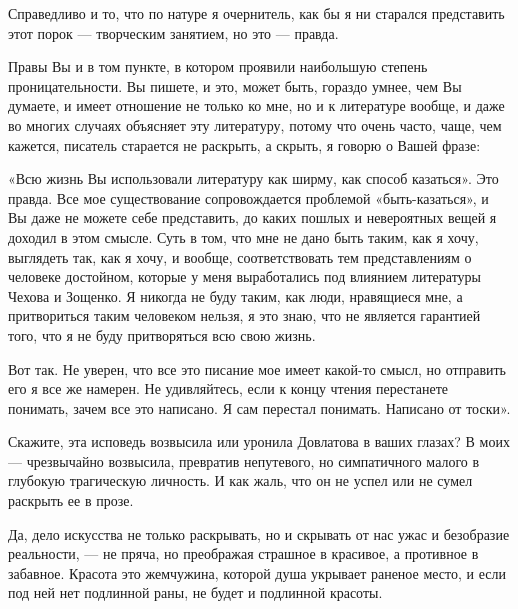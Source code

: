 Справедливо и то, что по натуре я очернитель, как бы я ни старался представить
этот порок — творческим занятием, но это — правда. 

Правы Вы и в том пункте, в котором проявили наибольшую степень
проницательности. Вы пишете, и это, может быть, гораздо умнее, чем Вы думаете,
и имеет отношение не только ко мне, но и к литературе вообще, и даже во многих
случаях объясняет эту литературу, потому что очень часто, чаще, чем кажется,
писатель старается не раскрыть, а скрыть, я говорю о Вашей фразе: 

«Всю жизнь Вы использовали литературу как ширму, как способ казаться». Это
правда. Все мое существование сопровождается проблемой «быть-казаться», и Вы
даже не можете себе представить, до каких пошлых и невероятных вещей я доходил
в этом смысле. Суть в том, что мне не дано быть таким, как я хочу, выглядеть
так, как я хочу, и вообще, соответствовать тем представлениям о человеке
достойном, которые у меня выработались под влиянием литературы Чехова и
Зощенко. Я никогда не буду таким, как люди, нравящиеся мне, а притвориться
таким человеком нельзя, я это знаю, что не является гарантией того, что я не
буду притворяться всю свою жизнь. 

Вот так. Не уверен, что все это писание мое имеет какой-то смысл, но отправить
его я все же намерен. Не удивляйтесь, если к концу чтения перестанете понимать,
зачем все это написано. Я сам перестал понимать. Написано от тоски». 

Скажите, эта исповедь возвысила или уронила Довлатова в ваших глазах? В моих —
чрезвычайно возвысила, превратив непутевого, но симпатичного малого в глубокую
трагическую личность. И как жаль, что он не успел или не сумел раскрыть ее в
прозе.

Да, дело искусства не только раскрывать, но и скрывать от нас ужас и безобразие
реальности, — не пряча, но преображая страшное в красивое, а противное в
забавное. Красота это жемчужина, которой душа укрывает раненое место, и если
под ней нет подлинной раны, не будет и подлинной красоты.
